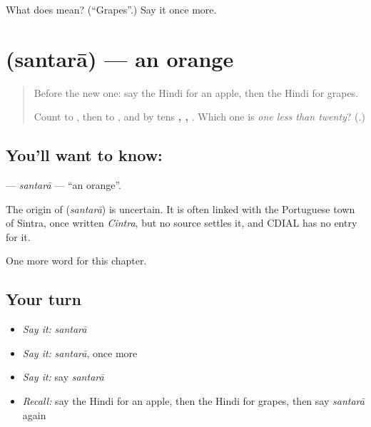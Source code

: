 \begin{tcolorbox}[breakable,colback=teal!4,colframe=teal!35!black,title={Before you move on}]
What does  mean? (\textquotedblleft{}Grapes\textquotedblright{}.) Say it once more.
\end{tcolorbox}
\section[\texorpdfstring{\hi{संतरा} (santarā)}{संतरा (santarā)}]{ (santarā) — an orange}

\label{lesson:HI-C140-santara}



\begin{quote}
Before the new one: say the Hindi for an apple, then the Hindi for grapes.

Count \textbf{} to \textbf{}, then \textbf{} to \textbf{}, and by tens \textbf{, , }. Which one is \emph{one less than twenty}? (\textbf{}.)
\end{quote}

\subsection*{You'll want to know: }
\textbf{} — \emph{santarā} — \textquotedblleft{}an orange\textquotedblright{}.

\begin{cousinweb}
The origin of \textbf{} (\emph{santarā}) is uncertain. It is often linked with the Portuguese town of Sintra, once written \emph{Cintra}, but no source settles it, and CDIAL has no entry for it.
\end{cousinweb}

\begin{grammarlens}[title={What you've built}]
One more word for this chapter.
\end{grammarlens}

\subsection*{Your turn}
\begin{itemize}
\raggedright
  \item \emph{Say it:} \emph{santarā}
  \item \emph{Say it:} \emph{santarā}, once more
  \item \emph{Say it:} say \emph{santarā}
  \item \emph{Recall:} say the Hindi for an apple, then the Hindi for grapes, then say \emph{santarā} again
\end{itemize}

